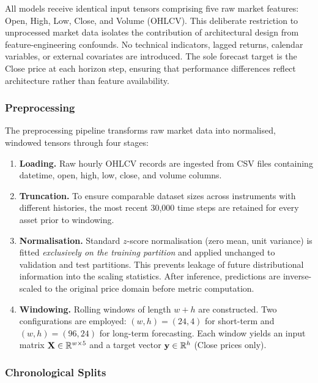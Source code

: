 All models receive identical input tensors comprising five raw market features: Open, High, Low, Close, and Volume (OHLCV).  This deliberate restriction to unprocessed market data isolates the contribution of architectural design from feature-engineering confounds.  No technical indicators, lagged returns, calendar variables, or external covariates are introduced.  The sole forecast target is the Close price at each horizon step, ensuring that performance differences reflect architecture rather than feature availability.

\subsubsection{Preprocessing}
\label{sec:preprocessing}

The preprocessing pipeline transforms raw market data into normalised, windowed tensors through four stages:

\begin{enumerate}
  \item \textbf{Loading.}  Raw hourly OHLCV records are ingested from CSV files containing datetime, open, high, low, close, and volume columns.

  \item \textbf{Truncation.}  To ensure comparable dataset sizes across instruments with different histories, the most recent 30{,}000 time steps are retained for every asset prior to windowing.

  \item \textbf{Normalisation.}  Standard $z$-score normalisation (zero mean, unit variance) is fitted \emph{exclusively on the training partition} and applied unchanged to validation and test partitions.  This prevents leakage of future distributional information into the scaling statistics.  After inference, predictions are inverse-scaled to the original price domain before metric computation.

  \item \textbf{Windowing.}  Rolling windows of length $w + h$ are constructed.  Two configurations are employed: $(w, h) = (24, 4)$ for short-term and $(w, h) = (96, 24)$ for long-term forecasting.  Each window yields an input matrix $\mathbf{X} \in \mathbb{R}^{w \times 5}$ and a target vector $\mathbf{y} \in \mathbb{R}^{h}$ (Close prices only).
\end{enumerate}

\subsubsection{Chronological Splits}
\label{sec:splits}

